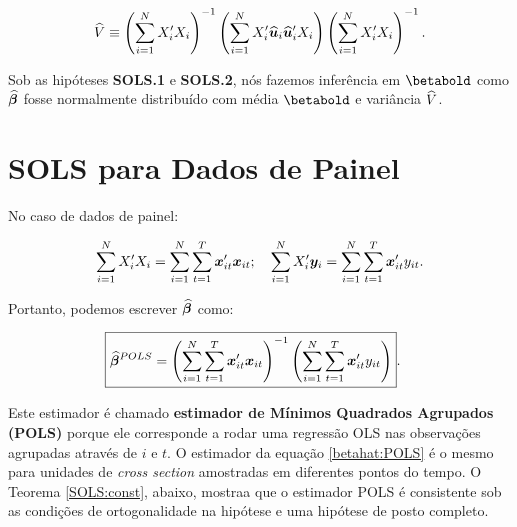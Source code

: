 \documentclass[11pt, oneside, a4paper, article]{article}
\numberwithin{equation}{section}
\begin{document}
\vspace{-1 em}
\begin{align*}
\widehat{V} \equiv 
\left( \sum_{i=1}^{N} X_{i}' X_{i}  \right)^{-1}
\left( \sum_{i=1}^{N} X_{i}' \widehat{\boldsymbol{u}}_{i} \widehat{\boldsymbol{u}}_{i}'  X_{i}  \right)
\left( \sum_{i=1}^{N} X_{i}' X_{i}  \right)^{-1}.
\end{align*}

Sob as hipóteses \textbf{SOLS.1} e \textbf{SOLS.2}, nós fazemos inferência em $\betabold$ como $\widehat{\boldsymbol{\beta}}$ fosse normalmente distribuído com média $\betabold$ e variância $\widehat{V}$.


\clearpage
\section{SOLS para Dados de Painel}
\noindent
\citet[Sec.7.8 -- The Linear Panel Data Model, Revisited. p.169]{wool-2010} 

No caso de dados de painel:

\vspace{-1 em}
\begin{align*}
\sum_{i=1}^{N} X_{i}' X_{i}
=
\sum_{i=1}^{N} \sum_{t=1}^{T} \boldsymbol{x}_{it}' \boldsymbol{x}_{it};
\quad
\sum_{i=1}^{N} X_{i}' \boldsymbol{y}_{i}
=
\sum_{i=1}^{N} \sum_{t=1}^{T} \boldsymbol{x}_{it}' y_{it}.
\end{align*}

Portanto, podemos escrever $\widehat{\boldsymbol{\beta}}$ como:

\vspace{-1 em}
\begin{align} \label{betahat:POLS}
\Aboxed{
\betahatbold^{POLS} =
\left( \sum_{i=1}^{N} \sum_{t=1}^{T} \mbs{x}_{it}' \mbs{x}_{it} \right)^{-1}
\left( \sum_{i=1}^{N} \sum_{t=1}^{T} \mbs{x}_{it}' y_{it} \right)
}.
\end{align}

Este estimador é chamado \textbf{estimador de Mínimos Quadrados Agrupados (POLS)} porque ele corresponde a rodar uma regressão OLS nas observações agrupadas através de $i$ e $t$. 
O estimador da equação \eqref{betahat:POLS} é o mesmo para unidades de \textit{cross section} amostradas em diferentes pontos do tempo.
O Teorema \ref{SOLS:const}, abaixo, mostraa que o estimador POLS é consistente sob as condições de ortogonalidade na hipótese  e uma hipótese de posto completo.
\end{document}
